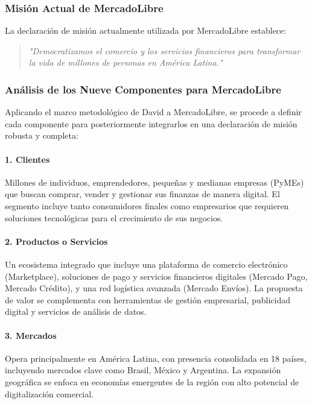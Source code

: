 \subsubsection{Misión Actual de MercadoLibre}

La declaración de misión actualmente utilizada por MercadoLibre \autocite{mercadolibre_mission} establece:

\begin{quote}
\textit{"Democratizamos el comercio y los servicios financieros para transformar la vida de millones de personas en América Latina."}
\end{quote}

\subsubsection{Análisis de los Nueve Componentes para MercadoLibre}

Aplicando el marco metodológico de David a MercadoLibre, se procede a definir cada componente para posteriormente integrarlos en una declaración de misión robusta y completa:

\paragraph{1. Clientes}
Millones de individuos, emprendedores, pequeñas y medianas empresas (PyMEs) que buscan comprar, vender y gestionar sus finanzas de manera digital. El segmento incluye tanto consumidores finales como empresarios que requieren soluciones tecnológicas para el crecimiento de sus negocios.

\paragraph{2. Productos o Servicios}
Un ecosistema integrado que incluye una plataforma de comercio electrónico (Marketplace), soluciones de pago y servicios financieros digitales (Mercado Pago, Mercado Crédito), y una red logística avanzada (Mercado Envíos). La propuesta de valor se complementa con herramientas de gestión empresarial, publicidad digital y servicios de análisis de datos.

\paragraph{3. Mercados}
Opera principalmente en América Latina, con presencia consolidada en 18 países, incluyendo mercados clave como Brasil, México y Argentina. La expansión geográfica se enfoca en economías emergentes de la región con alto potencial de digitalización comercial.

